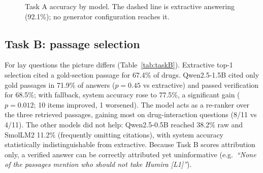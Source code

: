 \documentclass[conference]{IEEEtran}
\begin{document}
\begin{table}[t]
\caption{Task A predictions by gold label, and verified wrong answers}
\label{tab:polarity}
\centering
\setlength{\tabcolsep}{3.5pt}
\end{table}

\begin{figure}[t]
\centering
{}
\caption{Task A accuracy by model. The dashed line is extractive answering (92.1\%); no generator configuration reaches it.}
\label{fig:acc}
\end{figure}

\subsection{Task B: passage selection}
For lay questions the picture differs (Table~\ref{tab:taskB}). Extractive top-1 selection cited a gold-section passage for 67.4\% of drugs. Qwen2.5-1.5B cited only gold passages in 71.9\% of answers ($p=0.45$ vs extractive) and passed verification for 68.5\%; with fallback, system accuracy rose to 77.5\%, a significant gain ($p=0.012$; 10 items improved, 1 worsened). The model acts as a re-ranker over the three retrieved passages, gaining most on drug-interaction questions (8/11 vs 4/11). The other models did not help: Qwen2.5-0.5B reached 38.2\% raw and SmolLM2 11.2\% (frequently omitting citations), with system accuracy statistically indistinguishable from extractive. Because Task B scores attribution only, a verified answer can be correctly attributed yet uninformative (e.g.\ \emph{``None of the passages mention who should not take Humira [L1]''}).
\end{document}
